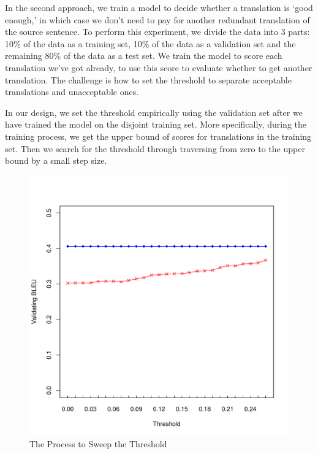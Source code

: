 \documentclass[11pt]{article}
\begin{document}
 In the second approach,  we train a model to decide whether a translation  is `good enough,' in which case we don't need to  pay for another redundant translation of the source sentence.  To perform this experiment, we divide the data into 3 parts: 10$\%$ of the data as a training set, 10$\%$ of the data as a validation set and the remaining 80$\%$ of the data as a test set. We train the model to score each translation we've got already, to use this score to evaluate whether to get another translation. The challenge is how to set the threshold to separate acceptable translations and unacceptable ones. 
 
 
 In our design, we set the threshold empirically using the validation set after we have trained the model on the disjoint training set. More specifically, during the training process, we get the upper bound of scores for translations in the training set. Then we search for the threshold through traversing from  zero to the upper bound by a small step size. %
 
 \begin{figure}[htbp]
  \centering
  \includegraphics[width=\linewidth]{WorkerSelection/bleuthreshold.pdf}
  \caption{The Process to Sweep the Threshold}
    \label{fsweepthre}
\end{figure}
\end{document}

